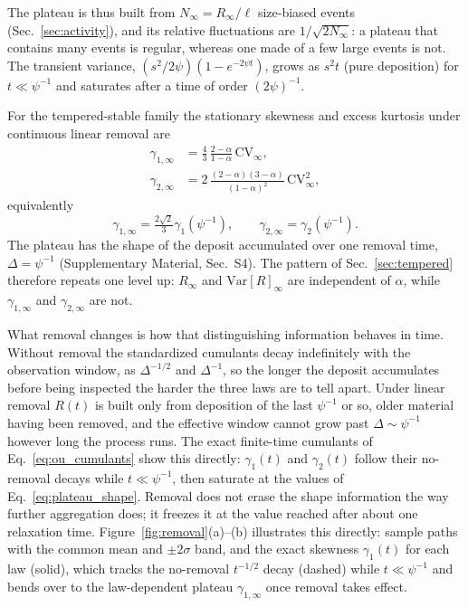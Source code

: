 \documentclass[preprint,12pt]{elsarticle}
\begin{document}
The plateau is thus built from $N_\infty=R_\infty/\ell$ size-biased events
(Sec.~\ref{sec:activity}), and its relative fluctuations are $1/\sqrt{2N_\infty}$:
a plateau that contains many events is regular, whereas one made of a few
large events is not. The transient variance, $(s^2/2\psi)(1-e^{-2\psi t})$,
grows as $s^2t$ (pure deposition) for $t\ll\psi^{-1}$ and saturates after a
time of order $(2\psi)^{-1}$.

For the tempered-stable family the stationary skewness and excess kurtosis
under continuous linear removal are
\begin{equation}
\begin{aligned}
  \gamma_{1,\infty}&=\frac43\,\frac{2-\alpha}{1-\alpha}\,\mathrm{CV}_\infty,\\
  \gamma_{2,\infty}&=2\,\frac{(2-\alpha)(3-\alpha)}{(1-\alpha)^2}\,\mathrm{CV}_\infty^2,
\end{aligned}
  \label{eq:plateau_shape}
\end{equation}
equivalently
\begin{equation}
\gamma_{1,\infty}=\tfrac{2\sqrt2}{3}\gamma_1(\psi^{-1}), \qquad
\gamma_{2,\infty}=\gamma_2(\psi^{-1}).
\end{equation}
The plateau has the shape of the
deposit accumulated over one removal time, $\Delta=\psi^{-1}$
(Supplementary Material, Sec.~S4).
The pattern of Sec.~\ref{sec:tempered} therefore repeats one level up:
$R_\infty$ and $\mathrm{Var}[R]_\infty$ are independent of $\alpha$, while
$\gamma_{1,\infty}$ and $\gamma_{2,\infty}$ are not.

What removal changes is how that distinguishing information behaves in time.
Without removal the standardized cumulants decay indefinitely with the
observation window, as $\Delta^{-1/2}$ and $\Delta^{-1}$, so the longer the
deposit accumulates before being inspected the harder the three laws are to
tell apart. Under linear removal $R(t)$ is built only from deposition of the
last $\psi^{-1}$ or so, older material having been removed, and the effective
window cannot grow past $\Delta\sim\psi^{-1}$ however long the process runs.
The exact finite-time cumulants of Eq.~\eqref{eq:ou_cumulants} show this
directly: $\gamma_1(t)$ and $\gamma_2(t)$ follow their no-removal decays while
$t\ll\psi^{-1}$, then saturate at the values of
Eq.~\eqref{eq:plateau_shape}. Removal does not erase the shape information the
way further aggregation does; it freezes it at the value reached after about
one relaxation time.
Figure~\ref{fig:removal}(a)--(b) illustrates this directly: sample paths
with the common mean and $\pm2\sigma$ band, and the exact skewness
$\gamma_1(t)$ for each law (solid), which tracks the no-removal
$t^{-1/2}$ decay (dashed) while $t\ll\psi^{-1}$ and bends over to the
law-dependent plateau $\gamma_{1,\infty}$ once removal takes effect.
\end{document}
